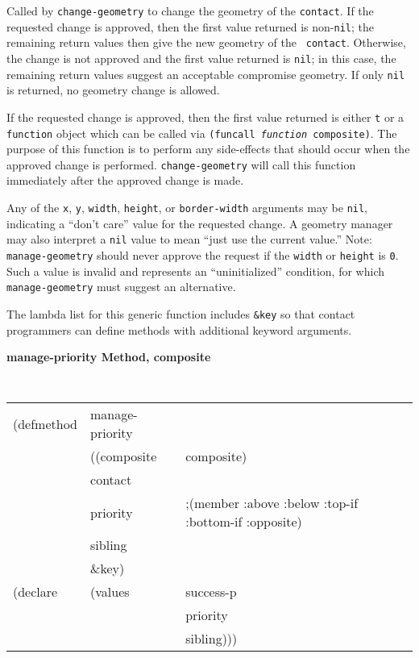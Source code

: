 \documentclass[twoside]{book}
\begin{document}
\begin{sloppy}
{\begin{flushright}
{}\end{flushright}}

\begin{flushright} 
\parbox[t]{6.125in}{
Called by {\tt change-geometry}
to change the geometry of the
{\tt contact}.
If the requested change is approved, then  the first value returned is
non-{\tt nil}; the remaining return values then give the new geometry of the {\tt
contact}. Otherwise, the change is not approved and the first value returned is
{\tt nil}; in this case, the remaining return values suggest an acceptable
compromise geometry.
If only {\tt nil} is returned, no geometry change is allowed.
}

\parbox[t]{6.125in}{ If the requested change is approved, then the first value
returned is either {\tt t} or a {\tt function} object which can be called via
{\tt (funcall {\em function} composite)}. The purpose of this function is to
perform any side-effects that should occur when the approved change is
performed. {\tt change-geometry} will call this function immediately after the
approved change is made.}

\parbox[t]{6.125in}{
Any of the {\tt x}, {\tt y}, {\tt width}, {\tt height}, or {\tt border-width}
arguments may be {\tt nil}, indicating a ``don't care'' value for the requested
change. A geometry manager may also interpret a {\tt nil} value to mean ``just
use the current value.''
Note: {\tt manage-geometry} should never approve the request if the {\tt width}
or {\tt height} is {\tt 0}. Such a value is invalid and represents an
``uninitialized'' condition, for which {\tt manage-geometry} must suggest
an alternative.
}

\parbox[t]{6.125in}{
The lambda list for this generic function includes {\tt \&key} so that contact
programmers can define methods with additional keyword arguments.
}
\end{flushright}
 

{\samepage
{\large {\bf manage-priority \hfill Method, composite}}
\begin{flushright} \parbox[t]{6.125in}{
\tt
\begin{tabular}{lll}
\raggedright
(defmethod & manage-priority & \\
& ((composite  &composite)\\
& contact\\
& priority & ;(member :above :below :top-if :bottom-if :opposite)\\
& sibling\\
& \&key) \\
(declare &(values &success-p\\
& & priority\\
& & sibling)))
\end{tabular}
\rm

}
\end{flushright}}
\end{sloppy}
\end{document}
